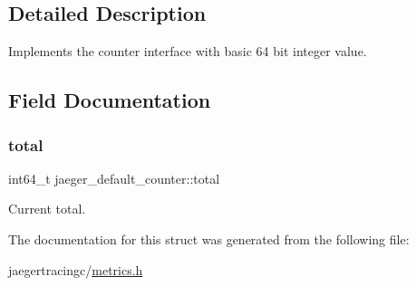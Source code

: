 \subsection{Detailed Description}
Implements the counter interface with basic 64 bit integer value. 

\subsection{Field Documentation}
\mbox{\label{structjaeger__default__counter_aaa90f254bc0b9720567642d2bb0422e8}} 
\subsubsection{\texorpdfstring{total}{total}}
{\footnotesize\ttfamily int64\+\_\+t jaeger\+\_\+default\+\_\+counter\+::total}



Current total. 



The documentation for this struct was generated from the following file\+:\begin{DoxyCompactItemize}
\item 
jaegertracingc/\mbox{\hyperlink{metrics_8h}{metrics.\+h}}\end{DoxyCompactItemize}
